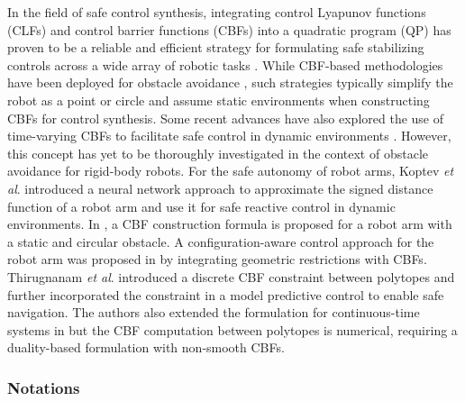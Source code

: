 In the field of safe control synthesis, integrating control Lyapunov functions (CLFs) and control barrier functions (CBFs) into a quadratic program (QP) has proven to be a reliable and efficient strategy for formulating safe stabilizing controls across a wide array of robotic tasks \cite{glotfelter2017nonsmooth, grandia_2021_legged, wang2017_aerial}. While CBF-based methodologies have been deployed for obstacle avoidance \cite{srinivasan2020synthesis, Long_learningcbf_ral21, almubarak2022safety, dawson2022learning, abdi2023safe}, such strategies typically simplify the robot as a point or circle and assume static environments when constructing CBFs for control synthesis. Some recent advances have also explored the use of time-varying CBFs to facilitate safe control in dynamic environments \cite{he2021rule, molnar2022safety, hamdipoor2023safe}. However, this concept has yet to be thoroughly investigated in the context of obstacle avoidance for rigid-body robots. For the safe autonomy of robot arms, Koptev \textit{et al}. \cite{Koptev2023_neural_joint_control} introduced a neural network approach to approximate the signed distance function of a robot arm and use it for safe reactive control in dynamic environments. In \cite{Hamatani2020arm}, a CBF construction formula is proposed for a robot arm with a static and circular obstacle. A configuration-aware control approach for the robot arm was proposed in \cite{ding2022configurationaware} by integrating geometric restrictions with CBFs. Thirugnanam \textit{et al}. \cite{discrete_polytope_cbf} introduced a discrete CBF constraint between polytopes and further incorporated the constraint in a model predictive control to enable safe navigation. The authors also extended the formulation for continuous-time systems in \cite{polytopic_cbf} but the CBF computation between polytopes is numerical, requiring a duality-based formulation with non-smooth CBFs. 

\subsubsection*{Notations}

